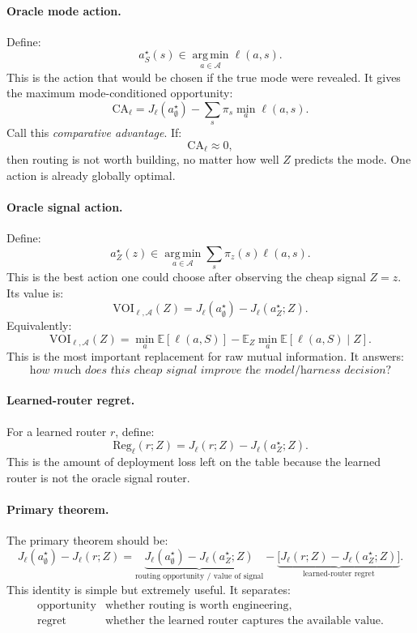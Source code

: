 \documentclass{article}
\providecommand{\argmin}{\operatorname*{arg\,min}}
\begin{document}
\paragraph{Oracle mode action.}
Define:
\[
    a^\star_S(s)
    \in
    \argmin_{a\in\mathcal A}\ell(a,s).
\]
This is the action that would be chosen if the true mode were revealed.
It gives the maximum mode-conditioned opportunity:
\[
    \mathrm{CA}_{\ell}
    =
    J_\ell(a^\star_{\emptyset})
    -
    \sum_s \pi_s\min_a \ell(a,s).
\]
Call this \emph{comparative advantage}.
If:
\[
    \mathrm{CA}_{\ell}\approx 0,
\]
then routing is not worth building, no matter how well \(Z\) predicts the mode.
One action is already globally optimal.

\paragraph{Oracle signal action.}
Define:
\[
    a^\star_Z(z)
    \in
    \argmin_{a\in\mathcal A}
    \sum_s \pi_z(s)\ell(a,s).
\]
This is the best action one could choose after observing the cheap signal \(Z=z\).
Its value is:
\[
    \mathrm{VOI}_{\ell,\mathcal A}(Z)
    =
    J_\ell(a^\star_{\emptyset})
    -
    J_\ell(a^\star_Z;Z).
\]
Equivalently:
\[
    \mathrm{VOI}_{\ell,\mathcal A}(Z)
    =
    \min_a \mathbb E[\ell(a,S)]
    -
    \mathbb E_Z
    \min_a \mathbb E[\ell(a,S)\mid Z].
\]
This is the most important replacement for raw mutual information.
It answers:
\[
    \textit{how much does this cheap signal improve the model/harness decision?}
\]

\paragraph{Learned-router regret.}
For a learned router \(r\), define:
\[
    \mathrm{Reg}_{\ell}(r;Z)
    =
    J_\ell(r;Z)-J_\ell(a^\star_Z;Z).
\]
This is the amount of deployment loss left on the table because the learned router is not
the oracle signal router.

\paragraph{Primary theorem.}
The primary theorem should be:
\[
\boxed{
    J_\ell(a^\star_{\emptyset}) - J_\ell(r;Z)
    =
    \underbrace{
    J_\ell(a^\star_{\emptyset})-J_\ell(a^\star_Z;Z)
    }_{\text{routing opportunity / value of signal}}
    -
    \underbrace{
    \bigl[
    J_\ell(r;Z)-J_\ell(a^\star_Z;Z)
    \bigr]
    }_{\text{learned-router regret}}.
}
\]
This identity is simple but extremely useful.
It separates:
\[
\begin{array}{ll}
    \text{opportunity} & \text{whether routing is worth engineering},\\
    \text{regret} & \text{whether the learned router captures the available value}.
\end{array}
\]
\end{document}
